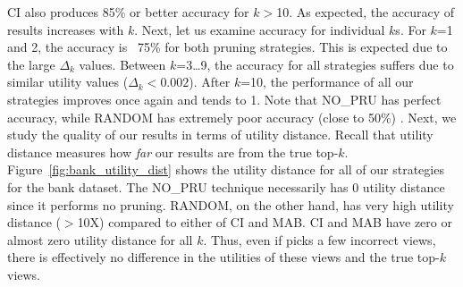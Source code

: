 CI also produces 85\% or better accuracy for $k$$>$10.
As expected, the accuracy of results increases with $k$.
Next, let us examine accuracy for individual $k$s.
For $k$=1 and 2, the accuracy is ~75\% for both pruning strategies. This is expected due to the large 
$\Delta_k$ values.
Between $k$=3\ldots9, the accuracy for all strategies suffers due to similar utility values 
($\Delta_k < 0.002$).
After $k$=10, the performance of all our strategies improves once again and tends to 1.
Note that NO\_PRU has perfect accuracy, while RANDOM has extremely poor accuracy (close to 50\%) .
Next, we study the quality of our results in terms of utility distance. 
Recall that utility distance measures how {\it far} our results are from the true top-$k$.
Figure~\ref{fig:bank_utility_dist} shows the utility distance for
all of our strategies for the bank dataset.
The NO\_PRU technique necessarily has 0 utility distance since
it performs no pruning.
RANDOM, on the other hand, has very high utility distance ($>$10X) compared to either of 
CI and MAB.
CI and MAB have zero or almost zero utility distance for all $k$.
Thus, even if \SeeDB picks a few incorrect views, there is effectively no difference in the 
utilities of these views and the true top-$k$ views.





